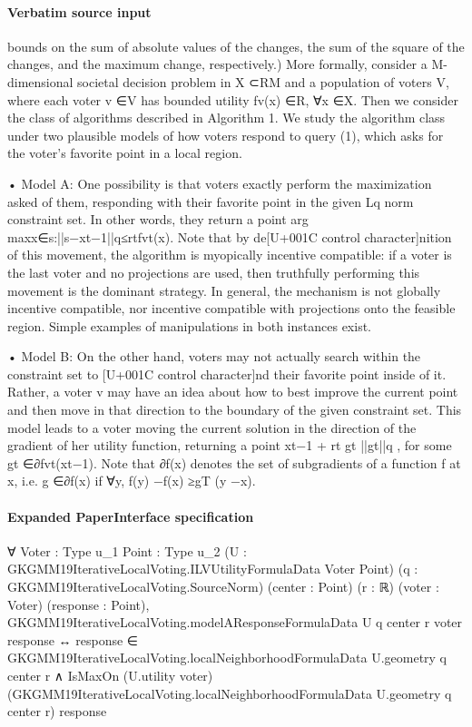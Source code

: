 \documentclass[10pt]{article}
\begin{document}
\paragraph{Verbatim source input}
\begin{ReviewVerbatim}
bounds on the sum of absolute values of the changes, the sum of the square of the changes,
and the maximum change, respectively.)
More formally, consider a M-dimensional societal decision problem in X ⊂RM and a
population of voters V, where each voter v ∈V has bounded utility fv(x) ∈R, ∀x ∈X.
Then we consider the class of algorithms described in Algorithm 1. We study the algorithm
class under two plausible models of how voters respond to query (1), which asks for the
voter's favorite point in a local region.

• Model A:
One possibility is that voters exactly perform the maximization asked of
them, responding with their favorite point in the given Lq norm constraint set. In other
words, they return a point arg maxx∈{s:||s−xt−1||q≤rt}fvt(x). Note that by de[U+001C control character]nition of this
movement, the algorithm is myopically incentive compatible: if a voter is the last voter
and no projections are used, then truthfully performing this movement is the dominant
strategy. In general, the mechanism is not globally incentive compatible, nor incentive
compatible with projections onto the feasible region. Simple examples of manipulations
in both instances exist.

• Model B: On the other hand, voters may not actually search within the constraint set
to [U+001C control character]nd their favorite point inside of it. Rather, a voter v may have an idea about how
to best improve the current point and then move in that direction to the boundary of
the given constraint set. This model leads to a voter moving the current solution in the
direction of the gradient of her utility function, returning a point xt−1 + rt
gt
||gt||q , for some
gt ∈∂fvt(xt−1). Note that ∂f(x) denotes the set of subgradients of a function f at x, i.e.
g ∈∂f(x) if ∀y, f(y) −f(x) ≥gT (y −x).
\end{ReviewVerbatim}


\paragraph{Expanded PaperInterface specification}
\begin{ReviewVerbatim}
∀ {Voter : Type u_1} {Point : Type u_2} (U : GKGMM19IterativeLocalVoting.ILVUtilityFormulaData Voter Point)
  (q : GKGMM19IterativeLocalVoting.SourceNorm) (center : Point) (r : ℝ) (voter : Voter) (response : Point),
  GKGMM19IterativeLocalVoting.modelAResponseFormulaData U q center r voter response ↔
    response ∈ GKGMM19IterativeLocalVoting.localNeighborhoodFormulaData U.geometry q center r ∧
      IsMaxOn (U.utility voter) (GKGMM19IterativeLocalVoting.localNeighborhoodFormulaData U.geometry q center r)
        response
\end{ReviewVerbatim}
\end{document}
